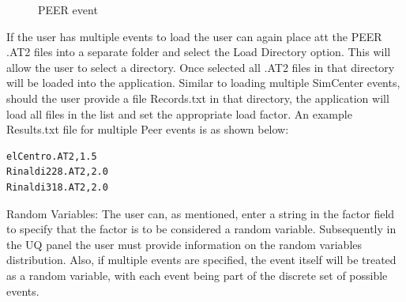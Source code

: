 \begin{figure}[!htbp]
  \caption{PEER event}
  \label{fig:figure6}
\end{figure}

If the user has multiple events to load the user can again place att the PEER .AT2 files into a separate folder and select the Load Directory option. This will allow the user to select a directory. Once selected all .AT2 files in that directory will be loaded into the application. Similar to loading multiple SimCenter events, should the user provide a file Records.txt in that directory, the application will load all files in the list and set the appropriate load factor. An example Results.txt file for multiple Peer events is as shown below:

\begin{verbatim}
elCentro.AT2,1.5
Rinaldi228.AT2,2.0
Rinaldi318.AT2,2.0
\end{verbatim}

Random Variables: The user can, as mentioned, enter a string in the factor field to specify that the factor is to be considered a random variable. Subsequently in the UQ panel the user must provide information on the random variables distribution. Also, if multiple events are specified, the event itself will be treated as a random variable, with each event being part of the discrete set of possible events.

